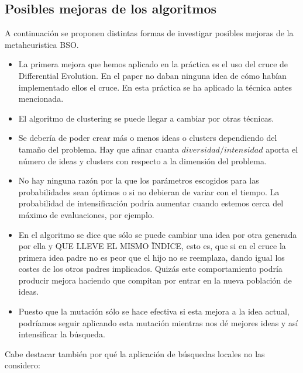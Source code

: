 \subsection{Posibles mejoras de los algoritmos}
A continuación se proponen distintas formas de investigar posibles mejoras de la metaheuristica BSO.
\begin{itemize}
	\item La primera mejora que hemos aplicado en la práctica es el uso del cruce de Differential Evolution. En el paper no daban ninguna idea de cómo habían implementado ellos el cruce. En esta práctica se ha aplicado la técnica antes mencionada.

	\item El algoritmo de clustering se puede llegar a cambiar por otras técnicas.

	\item Se debería de poder crear más o menos ideas o clusters dependiendo del tamaño del problema. Hay que afinar cuanta $diversidad/intensidad$ aporta el número de ideas y clusters con respecto a la dimensión del problema.

	\item No hay ninguna razón por la que los parámetros escogidos para las probabilidades sean óptimos o si no debieran de variar con el tiempo. La probabilidad de intensificación podría aumentar cuando estemos cerca del máximo de evaluaciones, por ejemplo.

	\item En el algoritmo se dice que sólo se puede cambiar una idea por otra generada por ella y QUE LLEVE EL MISMO ÏNDICE, esto es, que si en el cruce la primera idea padre no es peor que el hijo no se reemplaza, dando igual los costes de los otros padres implicados. Quizás este comportamiento podría producir mejora haciendo que compitan por entrar en la nueva población de ideas.

	\item Puesto que la mutación sólo se hace efectiva si esta mejora a la idea actual, podríamos seguir aplicando esta mutación mientras nos dé mejores ideas y así intensificar la búsqueda.
\end{itemize}

Cabe destacar también por qué la aplicación de búsquedas locales no las considero:

